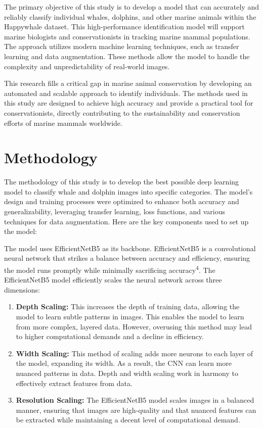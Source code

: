 \documentclass[twocolumn]{article}
\begin{document}
The primary objective of this study is to develop a model that can accurately and reliably classify individual whales, dolphins, and other marine animals within the Happywhale dataset. This high-performance identification model will support marine biologists and conservationists in tracking marine mammal populations. The approach utilizes modern machine learning techniques, such as transfer learning and data augmentation. These methods allow the model to handle the complexity and unpredictability of real-world images. 

This research fills a critical gap in marine animal conservation by developing an automated and scalable approach to identify individuals. The methods used in this study are designed to achieve high accuracy and provide a practical tool for conservationists, directly contributing to the sustainability and conservation efforts of marine mammals worldwide. 

\section{Methodology}
The methodology of this study is to develop the best possible deep learning model to classify whale and dolphin images into specific categories. The model’s design and training processes were optimized to enhance both accuracy and generalizability, leveraging transfer learning, loss functions, and various techniques for data augmentation. Here are the key components used to set up the model:

The model uses EfficientNetB5 as its backbone. EfficientNetB5 is a convolutional neural network that strikes a balance between accuracy and efficiency, ensuring the model runs promptly while minimally sacrificing accuracy\textsuperscript{4}. The EfficientNetB5 model efficiently scales the neural network across three dimensions: 

\begin{enumerate}
    \item \textbf{Depth Scaling:} This increases the depth of training data, allowing the model to learn subtle patterns in images. This enables the model to learn from more complex, layered data. However, overusing this method may lead to higher computational demands and a decline in efficiency.
    \item \textbf{Width Scaling:} This method of scaling adds more neurons to each layer of the model, expanding its width. As a result, the CNN can learn more nuanced patterns in data. Depth and width scaling work in harmony to effectively extract features from data.
    \item \textbf{Resolution Scaling:} The EfficientNetB5 model scales images in a balanced manner, ensuring that images are high-quality and that nuanced features can be extracted while maintaining a decent level of computational demand.
\end{enumerate}
\end{document}
